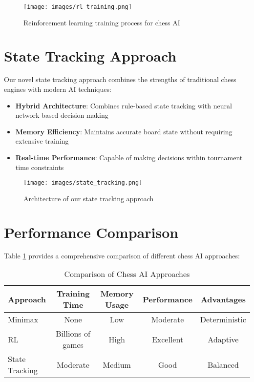 \documentclass[12pt,a4paper]{report}
\begin{document}
\begin{figure}[H]
    \centering
    \texttt{[image: images/rl\_training.png]}
    \caption{Reinforcement learning training process for chess AI}
    \label{fig:rl_training}
\end{figure}

\section{State Tracking Approach}
Our novel state tracking approach combines the strengths of traditional chess engines with modern AI techniques:

\begin{itemize}
    \item \textbf{Hybrid Architecture}: Combines rule-based state tracking with neural network-based decision making
    \item \textbf{Memory Efficiency}: Maintains accurate board state without requiring extensive training
    \item \textbf{Real-time Performance}: Capable of making decisions within tournament time constraints
\end{itemize}

\begin{figure}[H]
    \centering
    \texttt{[image: images/state\_tracking.png]}
    \caption{Architecture of our state tracking approach}
    \label{fig:state_tracking}
\end{figure}

\section{Performance Comparison}
Table \ref{tab:approach_comparison} provides a comprehensive comparison of different chess AI approaches:

\begin{table}[H]
\caption{Comparison of Chess AI Approaches}
\label{tab:approach_comparison}
\begin{center}
\begin{tabular}{|l|c|c|c|c|}
\hline
\textbf{Approach} & \textbf{Training Time} & \textbf{Memory Usage} & \textbf{Performance} & \textbf{Advantages} \\
\hline
Minimax & None & Low & Moderate & Deterministic \\
RL & Billions of games & High & Excellent & Adaptive \\
State Tracking & Moderate & Medium & Good & Balanced \\
\hline
\end{tabular}
\end{center}
\end{table}
\end{document}
